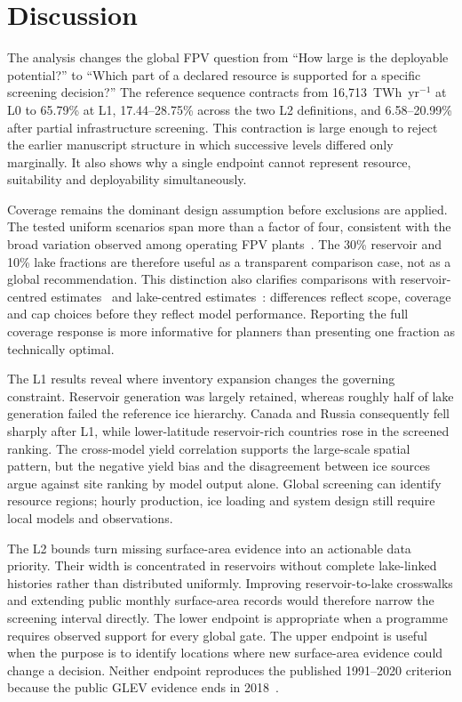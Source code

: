 \section{Discussion}

The analysis changes the global FPV question from ``How large is the deployable potential?'' to ``Which part of a declared resource is supported for a specific screening decision?'' The reference sequence contracts from 16{,}713~TWh~yr$^{-1}$ at L0 to 65.79\% at L1, 17.44--28.75\% across the two L2 definitions, and 6.58--20.99\% after partial infrastructure screening. This contraction is large enough to reject the earlier manuscript structure in which successive levels differed only marginally. It also shows why a single endpoint cannot represent resource, suitability and deployability simultaneously.

Coverage remains the dominant design assumption before exclusions are applied. The tested uniform scenarios span more than a factor of four, consistent with the broad variation observed among operating FPV plants~\citep{nobre2024}. The 30\% reservoir and 10\% lake fractions are therefore useful as a transparent comparison case, not as a global recommendation. This distinction also clarifies comparisons with reservoir-centred estimates~\citep{lee2020,jin2023} and lake-centred estimates~\citep{woolway2024}: differences reflect scope, coverage and cap choices before they reflect model performance. Reporting the full coverage response is more informative for planners than presenting one fraction as technically optimal.

The L1 results reveal where inventory expansion changes the governing constraint. Reservoir generation was largely retained, whereas roughly half of lake generation failed the reference ice hierarchy. Canada and Russia consequently fell sharply after L1, while lower-latitude reservoir-rich countries rose in the screened ranking. The cross-model yield correlation supports the large-scale spatial pattern, but the negative yield bias and the disagreement between ice sources argue against site ranking by model output alone. Global screening can identify resource regions; hourly production, ice loading and system design still require local models and observations.

The L2 bounds turn missing surface-area evidence into an actionable data priority. Their width is concentrated in reservoirs without complete lake-linked histories rather than distributed uniformly. Improving reservoir-to-lake crosswalks and extending public monthly surface-area records would therefore narrow the screening interval directly. The lower endpoint is appropriate when a programme requires observed support for every global gate. The upper endpoint is useful when the purpose is to identify locations where new surface-area evidence could change a decision. Neither endpoint reproduces the published 1991--2020 criterion because the public GLEV evidence ends in 2018~\citep{zhao2022glev}.

